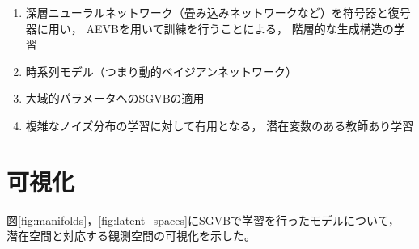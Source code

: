 \documentclass[dvipdfmx, fleqn]{jsarticle}
\begin{document}
\begin{enumerate}[label=(\roman*)]
    \item
        深層ニューラルネットワーク（畳み込みネットワークなど）を符号器と復号器に用い，
        AEVBを用いて訓練を行うことによる，
        階層的な生成構造の学習
    \item
        時系列モデル（つまり動的ベイジアンネットワーク）
    \item
        大域的パラメータへのSGVBの適用
    \item
        複雑なノイズ分布の学習に対して有用となる，
        潜在変数のある教師あり学習
\end{enumerate}



\appendix

\section{可視化}

図\ref{fig:manifolds}，\ref{fig:latent_spaces}にSGVBで学習を行ったモデルについて，
潜在空間と対応する観測空間の可視化を示した。
\end{document}
